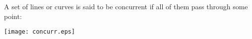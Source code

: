 \documentclass[12pt]{article}
\begin{document}
A set of lines or curves is said to be concurrent if all of them pass through some point:

\begin{center}
\texttt{[image: concurr.eps]}
\end{center}
\end{document}
